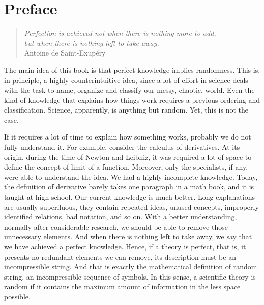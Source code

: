 %
%


\chapter*{Preface}

\begin{quote}
\begin{flushright}
\emph{Perfection is achieved not when there is nothing more to add, \\
but when there is nothing left to take away.}\\
Antoine de Saint-Exupéry\\
\end{flushright}
\end{quote}
\bigskip


The main idea of this book is that perfect knowledge implies randomness. This is, in principle, a highly counterintuitive idea, since a lot of effort in science deals with the task to name, organize and classify our messy, chaotic, world. Even the kind of knowledge that explains how things work requires a previous ordering and classification. Science, apparently, is anything but random. Yet, this is not the case.

If it requires a lot of time to explain how something works, probably we do not fully understand it. For example, consider the calculus of derivatives. At its origin, during the time of Newton and Leibniz, it was required a lot of space to define the concept of limit of a function. Moreover, only the specialists, if any, were able to understand the idea. We had a highly incomplete knowledge. Today, the definition of derivative barely takes one paragraph in a math book, and it is taught at high school. Our current knowledge is much better. Long explanations are usually superfluous, they contain repeated ideas, unused concepts, improperly identified relations, bad notation, and so on. With a better understanding, normally after considerable research, we should be able to remove those unnecessary elements. And when there is nothing left to take away, we say that we have achieved a perfect knowledge. Hence, if a theory is perfect, that is, it presents no redundant elements we can remove, its description must be an incompressible string. And that is exactly the mathematical definition of random string, an incompressible sequence of symbols. In this sense, a scientific theory is random if it contains the maximum amount of information in the less space possible.

